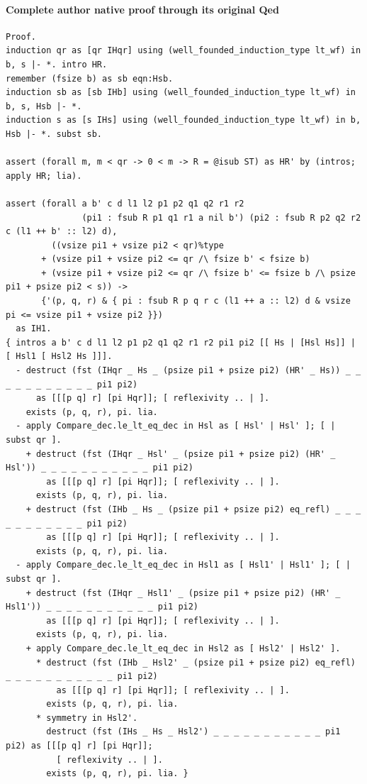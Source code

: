 \paragraph{Complete author native proof through its original Qed}
\begin{lstlisting}
Proof.
induction qr as [qr IHqr] using (well_founded_induction_type lt_wf) in b, s |- *. intro HR.
remember (fsize b) as sb eqn:Hsb.
induction sb as [sb IHb] using (well_founded_induction_type lt_wf) in b, s, Hsb |- *.
induction s as [s IHs] using (well_founded_induction_type lt_wf) in b, Hsb |- *. subst sb.

assert (forall m, m < qr -> 0 < m -> R = @isub ST) as HR' by (intros; apply HR; lia).

assert (forall a b' c d l1 l2 p1 p2 q1 q2 r1 r2
               (pi1 : fsub R p1 q1 r1 a nil b') (pi2 : fsub R p2 q2 r2 c (l1 ++ b' :: l2) d),
         ((vsize pi1 + vsize pi2 < qr)%type
       + (vsize pi1 + vsize pi2 <= qr /\ fsize b' < fsize b)
       + (vsize pi1 + vsize pi2 <= qr /\ fsize b' <= fsize b /\ psize pi1 + psize pi2 < s)) ->
       {'(p, q, r) & { pi : fsub R p q r c (l1 ++ a :: l2) d & vsize pi <= vsize pi1 + vsize pi2 }})
  as IH1.
{ intros a b' c d l1 l2 p1 p2 q1 q2 r1 r2 pi1 pi2 [[ Hs | [Hsl Hs]] | [ Hsl1 [ Hsl2 Hs ]]].
  - destruct (fst (IHqr _ Hs _ (psize pi1 + psize pi2) (HR' _ Hs)) _ _ _ _ _ _ _ _ _ _ _ pi1 pi2)
      as [[[p q] r] [pi Hqr]]; [ reflexivity .. | ].
    exists (p, q, r), pi. lia.
  - apply Compare_dec.le_lt_eq_dec in Hsl as [ Hsl' | Hsl' ]; [ | subst qr ].
    + destruct (fst (IHqr _ Hsl' _ (psize pi1 + psize pi2) (HR' _ Hsl')) _ _ _ _ _ _ _ _ _ _ _ pi1 pi2)
        as [[[p q] r] [pi Hqr]]; [ reflexivity .. | ].
      exists (p, q, r), pi. lia.
    + destruct (fst (IHb _ Hs _ (psize pi1 + psize pi2) eq_refl) _ _ _ _ _ _ _ _ _ _ _ pi1 pi2)
        as [[[p q] r] [pi Hqr]]; [ reflexivity .. | ].
      exists (p, q, r), pi. lia.
  - apply Compare_dec.le_lt_eq_dec in Hsl1 as [ Hsl1' | Hsl1' ]; [ | subst qr ].
    + destruct (fst (IHqr _ Hsl1' _ (psize pi1 + psize pi2) (HR' _ Hsl1')) _ _ _ _ _ _ _ _ _ _ _ pi1 pi2)
        as [[[p q] r] [pi Hqr]]; [ reflexivity .. | ].
      exists (p, q, r), pi. lia.
    + apply Compare_dec.le_lt_eq_dec in Hsl2 as [ Hsl2' | Hsl2' ].
      * destruct (fst (IHb _ Hsl2' _ (psize pi1 + psize pi2) eq_refl) _ _ _ _ _ _ _ _ _ _ _ pi1 pi2)
          as [[[p q] r] [pi Hqr]]; [ reflexivity .. | ].
        exists (p, q, r), pi. lia.
      * symmetry in Hsl2'.
        destruct (fst (IHs _ Hs _ Hsl2') _ _ _ _ _ _ _ _ _ _ _ pi1 pi2) as [[[p q] r] [pi Hqr]];
          [ reflexivity .. | ].
        exists (p, q, r), pi. lia. }


\end{lstlisting}
